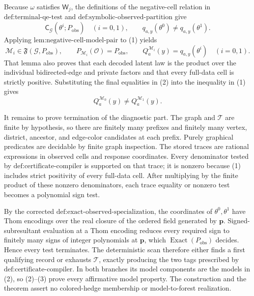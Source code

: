 Because \(\omega\) satisfies \(\mathsf W_j\), the definitions of the negative-cell relation in \(\text{def:terminal-qe-test}\) and \(\text{def:symbolic-observed-partition}\) give
\[
\mathsf C_{\mathcal G}(\theta^i;P_{\mathrm{obs}})
\quad(i=0,1),
\qquad
q_{a,y}(\theta^0)\neq q_{a,y}(\theta^1).
\tag{1}
\]
Applying \(\text{lem:negative-cell-model-pair}\) to (1) yields
\[
\mathcal M_i\in\mathfrak F(\mathcal G,P_{\mathrm{obs}}),
\qquad
P_{\mathcal M_i}(\mathcal O)=P_{\mathrm{obs}},
\qquad
Q_a^{\mathcal M_i}(y)=q_{a,y}(\theta^i)
\quad(i=0,1).
\tag{2}
\]
That lemma also proves that each decoded latent law is the product over the individual bidirected-edge and private factors and that every full-data cell is strictly positive. Substituting the final equalities in (2) into the inequality in (1) gives
\[
Q_a^{\mathcal M_0}(y)\neq Q_a^{\mathcal M_1}(y).
\tag{3}
\]

It remains to prove termination of the diagnostic part. The graph and \(\mathcal T\) are finite by hypothesis, so there are finitely many prefixes and finitely many vertex, district, ancestor, and edge-color candidates at each prefix. Purely graphical predicates are decidable by finite graph inspection. The stored traces are rational expressions in observed cells and response coordinates. Every denominator tested by \(\text{def:certificate-compiler}\) is supported on that trace; it is nonzero because (1) includes strict positivity of every full-data cell. After multiplying by the finite product of these nonzero denominators, each trace equality or nonzero test becomes a polynomial sign test.

By the corrected \(\text{def:exact-observed-specialization}\), the coordinates of \(\theta^0,\theta^1\) have Thom encodings over the real closure of the ordered field generated by \(\mathbf p\). Signed-subresultant evaluation at a Thom encoding reduces every required sign to finitely many signs of integer polynomials at \(\mathbf p\), which \(\operatorname{Exact}(P_{\mathrm{obs}})\) decides. Hence every test terminates. The deterministic scan therefore either finds a first qualifying record or exhausts \(\mathcal T\), exactly producing the two tags prescribed by \(\text{def:certificate-compiler}\). In both branches its model components are the models in (2), so (2)--(3) prove every affirmative model property. The construction and the theorem assert no colored-hedge membership or model-to-forest realization.